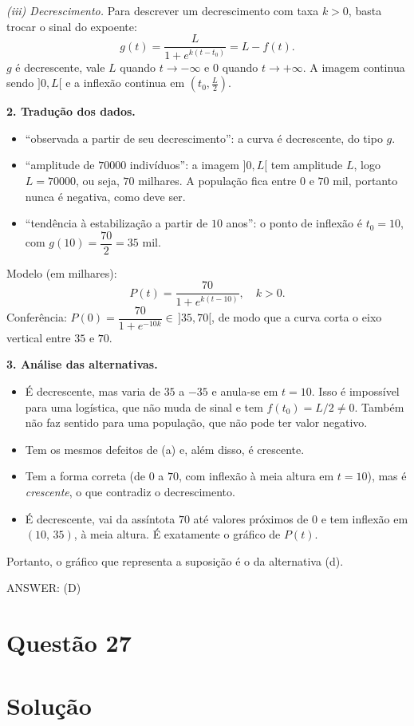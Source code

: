 \documentclass{article}%
\begin{document}
\emph{(iii) Decrescimento.} Para descrever um decrescimento com taxa $k>0$, basta trocar o sinal do expoente:
\[
g(t)=\frac{L}{1+e^{k(t-t_0)}}=L-f(t).
\]
$g$ é decrescente, vale $L$ quando $t\to-\infty$ e $0$ quando $t\to+\infty$. A imagem continua sendo $]0,L[$ e a inflexão continua em $\left(t_0,\tfrac{L}{2}\right)$.

\textbf{2. Tradução dos dados.}
\begin{itemize}
\item ``observada a partir de seu decrescimento'': a curva é decrescente, do tipo $g$.
\item ``amplitude de $70000$ indivíduos'': a imagem $]0,L[$ tem amplitude $L$, logo $L=70000$, ou seja, $70$ milhares. A população fica entre $0$ e $70$ mil, portanto nunca é negativa, como deve ser.
\item ``tendência à estabilização a partir de $10$ anos'': o ponto de inflexão é $t_0=10$, com $g(10)=\dfrac{70}{2}=35$ mil.
\end{itemize}
Modelo (em milhares):
\[
P(t)=\frac{70}{1+e^{k(t-10)}},\quad k>0.
\]
Conferência: $P(0)=\dfrac{70}{1+e^{-10k}}\in\,]35,70[$, de modo que a curva corta o eixo vertical entre $35$ e $70$.

\textbf{3. Análise das alternativas.}
\begin{itemize}
\item[a)] É decrescente, mas varia de $35$ a $-35$ e anula-se em $t=10$. Isso é impossível para uma logística, que não muda de sinal e tem $f(t_0)=L/2\neq 0$. Também não faz sentido para uma população, que não pode ter valor negativo.
\item[b)] Tem os mesmos defeitos de (a) e, além disso, é crescente.
\item[c)] Tem a forma correta (de $0$ a $70$, com inflexão à meia altura em $t=10$), mas é \emph{crescente}, o que contradiz o decrescimento.
\item[d)] É decrescente, vai da assíntota $70$ até valores próximos de $0$ e tem inflexão em $(10,\,35)$, à meia altura. É exatamente o gráfico de $P(t)$.
\end{itemize}

Portanto, o gráfico que representa a suposição é o da alternativa (d).

ANSWER: (D)%
\newpage%
\section*{Questão 27}

\section*{Solução}
\end{document}
